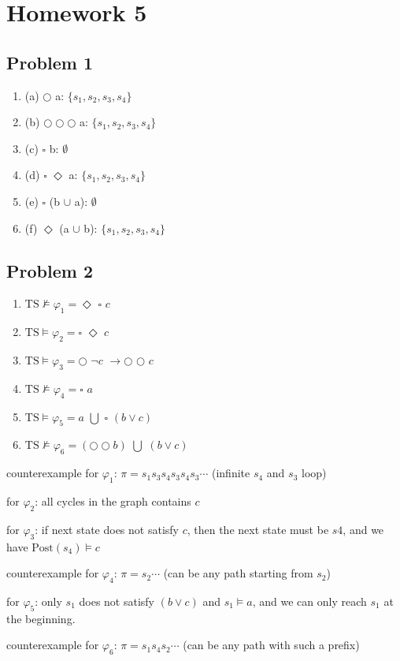 \chapter{Homework 5}

\section{Problem 1}

\begin{enumerate}
    \item (a) $\bigcirc$ a: $\{s_1, s_2, s_3, s_4\}$
    \item (b) $\bigcirc \bigcirc \bigcirc$ a: $\{s_1, s_2, s_3, s_4\}$
    \item (c) $\square$ b: $\emptyset$
    \item (d) $\square$ $\Diamond$ a: $\{s_1, s_2, s_3, s_4\}$
    \item (e) $\square$ (b $\cup$  a): $\emptyset$
    \item (f) $\Diamond$ (a $\cup$ b): $\{s_1, s_2, s_3, s_4\}$
\end{enumerate}

\section{Problem 2}

\newcommand{\TS}{\text{TS}}

\begin{enumerate}
    \item $\TS \not \models \varphi_1 = \Diamond$ $\square$ $c$
    \item $\TS \models \varphi_2 = \square$ $\Diamond$ $c$
    \item $\TS \models \varphi_3 = \bigcirc$ $\neg c$ $\rightarrow \bigcirc$ $ \bigcirc$ $c$
    \item $\TS \not \models \varphi_4 = \square$ $a$
    \item $\TS \models \varphi_5 = a$ $\bigcup$ $\square$ $(b \vee c)$
    \item $\TS \not \models \varphi_6 = (\bigcirc \bigcirc b)$ $\bigcup$ $(b \vee c)$
\end{enumerate}

counterexample for $\varphi_1$: $\pi = s_1 s_3 s_4 s_3 s_4 s_3 \cdots$  (infinite $s_4$ and $s_3$ loop)

for $\varphi_2$: all cycles in the graph contains $c$

for $\varphi_3$: if next state does not satisfy $c$, then the next state must be $s4$,
and we have $\text{Post}(s_4) \models c$

counterexample for $\varphi_4$: $\pi = s_2 \cdots$ (can be any path starting from $s_2$)

for $\varphi_5$: only $s_1$ does not satisfy $(b \vee c)$ and $s_1 \models a$, and we can only reach
$s_1$ at the beginning.

counterexample for $\varphi_6$: $\pi = s_1 s_4 s_2 \cdots$ (can be any path with such a prefix)

